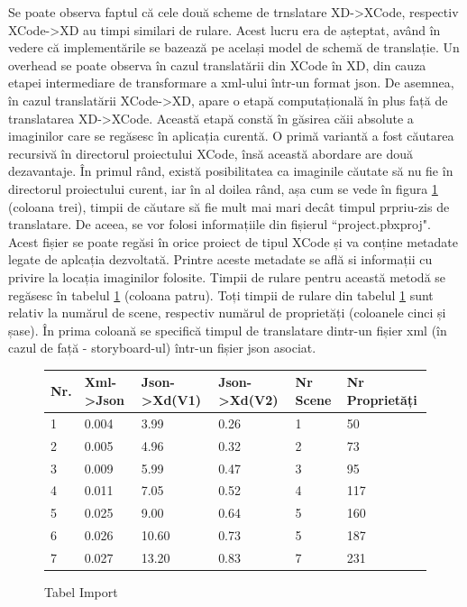 Se poate observa faptul că cele două scheme de trnslatare XD->XCode, respectiv XCode->XD au timpi similari de rulare. Acest lucru era de așteptat, având în vedere că implementările se bazează pe același model de schemă de translație. Un overhead se poate observa în cazul translatării din XCode în XD, din cauza etapei intermediare de transformare a xml-ului într-un format json. De asemnea, în cazul translatării XCode->XD, apare o etapă computațională în plus față de translatarea XD->XCode. Această etapă constă în găsirea căii absolute a imaginilor care se regăsesc în aplicația curentă. O primă variantă a fost căutarea recursivă în directorul proiectului XCode, însă această abordare are două dezavantaje. În primul rând, există posibilitatea ca imaginile căutate să nu fie în directorul proiectului curent, iar în al doilea rând, așa cum se vede în figura \ref{fig:Tabimport} (coloana trei), timpii de căutare să fie mult mai mari decât timpul prpriu-zis de translatare. De aceea, se vor folosi informațiile din fișierul ``project.pbxproj". Acest fișier se poate regăsi în orice proiect de tipul XCode și va conține metadate legate de aplcația dezvoltată. Printre aceste metadate se află si informații cu privire la locația imaginilor folosite. Timpii de rulare pentru această metodă se regăsesc în tabelul \ref{fig:Tabimport} (coloana patru). Toți timpii de rulare din tabelul \ref{fig:Tabimport} sunt relativ la numărul de scene, respectiv numărul de proprietăți (coloanele cinci și șase). În prima coloană se specifică timpul de translatare dintr-un fișier xml (în cazul de față - storyboard-ul) într-un fișier json asociat.

\begin{figure}[!htbp]
\centering
\begin{center}
    \begin{tabular}{| l | l | l | l |l |l |}
    \hline
    Nr. & Xml->Json & Json->Xd(V1) & Json->Xd(V2) & Nr Scene & Nr Proprietăți\\ \hline
    1 & 0.004 & 3.99 & 0.26 & 1 & 50\\ \hline
    2 & 0.005 & 4.96 & 0.32 & 2 & 73\\ \hline
    3 & 0.009 & 5.99 & 0.47 & 3 & 95\\ \hline
    4 & 0.011 & 7.05 & 0.52 & 4 & 117\\ \hline
    5 & 0.025 & 9.00 & 0.64 & 5 & 160\\ \hline
    6 & 0.026 & 10.60 & 0.73 & 5 & 187\\ \hline
    7 & 0.027 & 13.20 & 0.83 & 7 & 231\\ \hline
    \end{tabular}
\end{center}
\caption{Tabel Import} \label{fig:Tabimport}
\end{figure}

